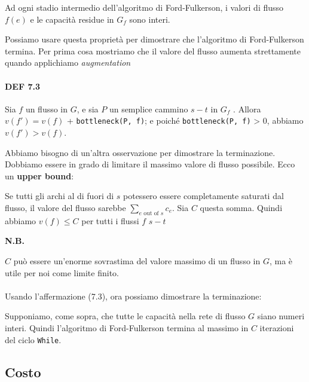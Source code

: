 \begin{myblockquote}
Ad ogni stadio intermedio dell'algoritmo di Ford-Fulkerson, i valori di
flusso $f(e)$ e le capacità residue in $G_f$ sono interi.
\end{myblockquote}

Possiamo usare questa proprietà per dimostrare che l'algoritmo di
Ford-Fulkerson termina. Per prima cosa mostriamo che il valore del
flusso aumenta strettamente quando applichiamo \emph{augmentation}

\paragraph{DEF 7.3}
\begin{myblockquote}
    Sia $f$ un flusso in $G$, e sia $P$ un semplice cammino $s-t$ in
    $G_f$ . Allora $v(f') = v(f)$ + \texttt{bottleneck(P,\ f)}; e poiché
    \texttt{bottleneck(P,\ f)} \textgreater{} 0, abbiamo $v(f') > v(f)$.
\end{myblockquote}

Abbiamo bisogno di un'altra osservazione per dimostrare la terminazione.
Dobbiamo essere in grado di limitare il massimo valore di flusso
possibile. Ecco un \textbf{upper bound}:

\begin{myblockquote}
    Se tutti gli archi al di
    fuori di $s$ potessero essere completamente saturati dal flusso, il
    valore del flusso sarebbe $\sum_{e \text{ out of }s} c_e$. Sia $C$
    questa somma. Quindi abbiamo $v(f) \le C$ per tutti i flussi $f$
    $s-t$
\end{myblockquote}

\textbf{N.B.}

$C$ può essere un'enorme sovrastima del valore massimo
di un flusso in $G$, ma è utile per noi come limite finito.
\\
\\
Usando l'affermazione (7.3), ora possiamo dimostrare la terminazione:

\begin{myblockquote}
    Supponiamo, come sopra, che tutte le capacità nella rete
    di flusso $G$ siano numeri interi. Quindi l'algoritmo di
    Ford-Fulkerson termina al massimo in $C$ iterazioni del ciclo
    \texttt{While}.
\end{myblockquote}


\subsection{Costo}

